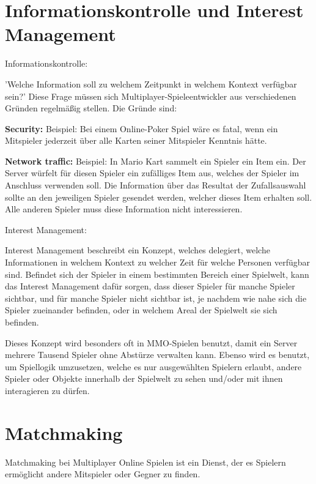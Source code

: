 \section{Informationskontrolle und Interest Management}

\textsf{\Large Informationskontrolle:}

'Welche Information soll zu welchem Zeitpunkt in welchem Kontext verfügbar sein?' Diese Frage müssen sich Multiplayer-Spieleentwickler aus verschiedenen Gründen regelmäßig stellen.
Die Gründe sind:

\textbf{Security:}
Beispiel: Bei einem Online-Poker Spiel wäre es fatal, wenn ein Mitspieler jederzeit über alle Karten seiner Mitspieler Kenntnis hätte. 

\textbf{Network traffic:}
Beispiel: In Mario Kart sammelt ein Spieler ein Item ein. Der Server würfelt für diesen Spieler ein zufälliges Item aus, welches der Spieler im Anschluss verwenden soll. Die Information über das Resultat der Zufallsauswahl sollte an den jeweiligen Spieler gesendet werden, welcher dieses Item erhalten soll. Alle anderen Spieler muss diese Information nicht interessieren.
 
\textsf{\Large Interest Management:}
\label{interest_management}

Interest Management beschreibt ein Konzept, welches delegiert, welche Informationen in welchem Kontext zu welcher Zeit für welche Personen verfügbar sind. Befindet sich der Spieler in einem bestimmten Bereich einer Spielwelt, kann das Interest Management dafür sorgen, dass dieser Spieler für manche Spieler sichtbar, und für manche Spieler nicht sichtbar ist, je nachdem wie nahe sich die Spieler zueinander befinden, oder in welchem Areal der Spielwelt sie sich befinden.

Dieses Konzept wird besonders oft in MMO-Spielen \cite{Wikipedia.2021i} benutzt, damit ein Server mehrere Tausend Spieler ohne Abstürze verwalten kann. Ebenso wird es benutzt, um Spiellogik umzusetzen, welche es nur ausgewählten Spielern erlaubt, andere Spieler oder Objekte innerhalb der Spielwelt zu sehen und/oder mit ihnen interagieren zu dürfen.

\cite{Smed.2002c}


\section{Matchmaking}

Matchmaking bei Multiplayer Online Spielen ist ein Dienst, der es Spielern ermöglicht andere Mitspieler oder Gegner zu finden. \cite{.2014}

